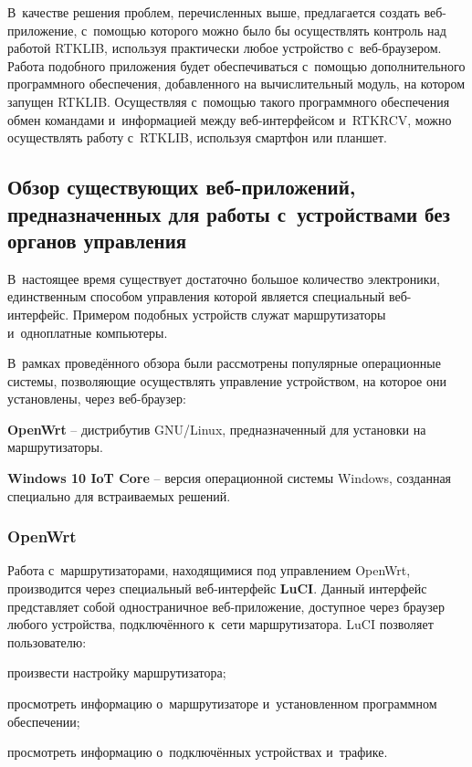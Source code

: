 В~качестве решения проблем, перечисленных выше, предлагается создать веб-приложение, с~помощью которого можно было бы осуществлять контроль над работой RTKLIB, используя практически любое устройство с~веб-браузером. Работа подобного приложения будет обеспечиваться с~помощью дополнительного программного обеспечения, добавленного на вычислительный модуль, на котором запущен RTKLIB. Осуществляя с~помощью такого программного обеспечения обмен командами и~информацией между веб-интерфейсом и~RTKRCV, можно осуществлять работу с~RTKLIB, используя смартфон или планшет.

\subsection{Обзор существующих веб-приложений, предназначенных для работы с~устройствами без органов управления}
\label{subsec:web-apps-review}

В~настоящее время существует достаточно большое количество электроники, единственным способом управления которой является специальный веб-интерфейс. Примером подобных устройств служат маршрутизаторы и~одноплатные компьютеры.

В~рамках проведённого обзора были рассмотрены популярные операционные системы, позволяющие осуществлять управление устройством, на которое они установлены, через веб-браузер:

\begin{dashitemize}
  \item \textbf{OpenWrt} -- дистрибутив GNU/Linux, предназначенный для установки на маршрутизаторы.
  \item \textbf{Windows 10 IoT Core} -- версия операционной системы Windows, созданная специально для встраиваемых решений.
\end{dashitemize}

\subsubsection{OpenWrt}
\label{subsec:openwrt-review}

Работа с~маршрутизаторами, находящимися под управлением OpenWrt, производится через специальный веб-интерфейс \textbf{LuCI}. Данный интерфейс представляет собой одностраничное веб-приложение, доступное через браузер любого устройства, подключённого к~сети маршрутизатора. LuCI позволяет пользователю:

\begin{dashitemize}
  \item произвести настройку маршрутизатора;
  \item просмотреть информацию о~маршрутизаторе и~установленном программном обеспечении;
  \item просмотреть информацию о~подключённых устройствах и~трафике.
\end{dashitemize}

